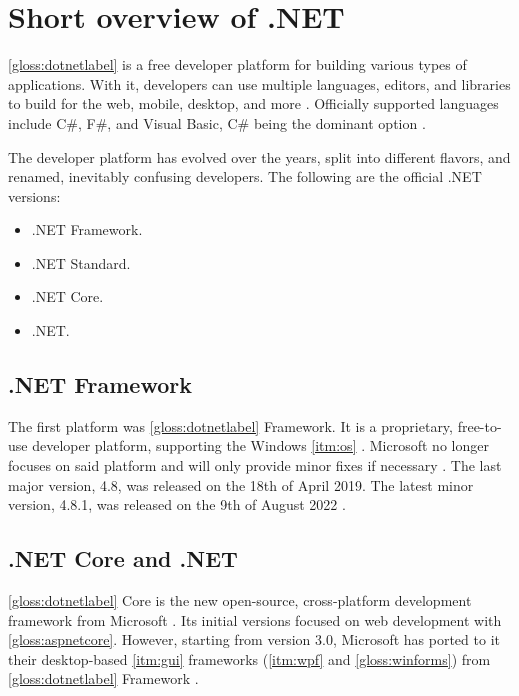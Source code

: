 \chapter{Short overview of .NET} \label{chap:overviewNET}
\ref{gloss:dotnetlabel} is a free developer platform for building various types of applications. With it, developers can use multiple languages, editors, and libraries to build for the web, mobile, desktop, and more \cite{microsoft_what_2022}.
Officially supported languages include C\#, F\#, and Visual Basic, C\# being the dominant option \cite{noauthor_tiobe_2022}.

The developer platform has evolved over the years, split into different flavors, and renamed, inevitably confusing developers.
The following are the official .NET versions:
\begin{itemize}
    \item .NET Framework.
    \item .NET Standard.
    \item .NET Core.
    \item .NET.
\end{itemize}

\section{.NET Framework} \label{sec:netFramework}

The first platform was \ref{gloss:dotnetlabel} Framework. It is a proprietary, free-to-use developer platform, supporting the Windows \ref{itm:os} \cite{code_maze_differences_2022}. Microsoft no longer focuses on said platform and will only provide minor fixes if necessary \cite{code_maze_differences_2022}. The last major version, 4.8, was released on the 18th of April 2019. The latest minor version, 4.8.1, was released on the 9th of August 2022 \cite{micosoft_microsoft_2022}.

\section{.NET Core and .NET} \label{sec:netCore}

\ref{gloss:dotnetlabel} Core is the new open-source, cross-platform development framework from Microsoft \cite{code_maze_differences_2022}. Its initial versions focused on web development with \ref{gloss:aspnetcore}. However, starting from version 3.0, Microsoft has ported to it their desktop-based \ref{itm:gui} frameworks (\ref{itm:wpf} and \ref{gloss:winforms}) from \ref{gloss:dotnetlabel} Framework \cite{george_whats_2022}.

